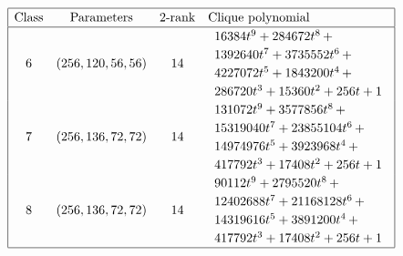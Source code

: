 \documentclass[12pt,a4paper]{article}
\begin{document}
\newpage
\small{}
\begin{align*}
\def\arraystretch{1.2}
\begin{array}{|cccl|}
\hline
\text{Class} &
\text{Parameters} &
\text{2-rank} &
\text{Clique polynomial}
\\
\hline
6 &
(256, 120, 56, 56) &
14 &
\begin{array}{l}
16384t^{9} + 284672t^{8}
\,+
\\
 1392640t^{7} + 3735552t^{6}
\,+
\\
 4227072t^{5} + 1843200t^{4}
\,+
\\
 286720t^{3} + 15360t^{2} + 256t + 1
\end{array}
\\
7 &
(256, 136, 72, 72) &
14 &
\begin{array}{l}
131072t^{9} + 3577856t^{8}
\,+
\\
 15319040t^{7} + 23855104t^{6}
\,+
\\
 14974976t^{5} + 3923968t^{4}
\,+
\\
 417792t^{3} + 17408t^{2} + 256t + 1
\end{array}
\\
8 &
(256, 136, 72, 72) &
14 &
\begin{array}{l}
90112t^{9} + 2795520t^{8}
\,+
\\
 12402688t^{7} + 21168128t^{6}
\,+
\\
 14319616t^{5} + 3891200t^{4}
\,+
\\
 417792t^{3} + 17408t^{2} + 256t + 1
\end{array}
\\
\hline
\end{array}
\end{align*}
\end{document}
